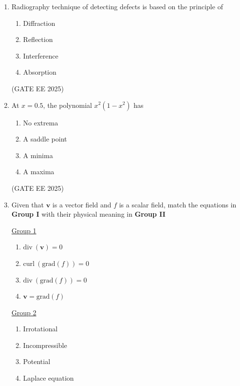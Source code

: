 \documentclass[11pt, letterpaper]{article}
\theoremstyle{remark}
\begin{document}
\begin{enumerate}
\item Radiography technique of detecting defects is based on the principle of

\begin{multicols}{4}
\begin{enumerate}  
\item Diffraction
\item Reflection
\item Interference
\item Absorption
\end{enumerate}
\end{multicols}
\hfill(GATE EE 2025)

\item At \(x=0.5\), the polynomial \(x^2(1-x^2)\) has

\begin{multicols}{4}
\begin{enumerate}  
\item No extrema
\item A saddle point
\item A minima
\item A maxima
\end{enumerate}
\end{multicols}
\hfill(GATE EE 2025)

\item Given that $\mathbf{v}$ is a vector field and $f$ is a scalar field, match the equations in \textbf{Group I} with their physical meaning in \textbf{Group II}
\begin{multicols}{2}
\underline{Group 1}
\begin{enumerate}[label=(\Alph*), start=16]
\item $\mathrm{div}\ (\mathbf{v}) = 0$  
\item $\mathrm{curl}\ (\mathrm{grad}(f)) = 0$
\item $\mathrm{div}\ (\mathrm{grad}(f)) = 0$
\item $\mathbf{v} = \mathrm{grad}(f)$
\end{enumerate}

\underline{Group 2}
\begin{enumerate}[label=(\arabic*), start=1]
\item Irrotational 
\item Incompressible
\item Potential
\item Laplace equation 
\end{enumerate}
\end{multicols}


\end{enumerate}
\end{document}
